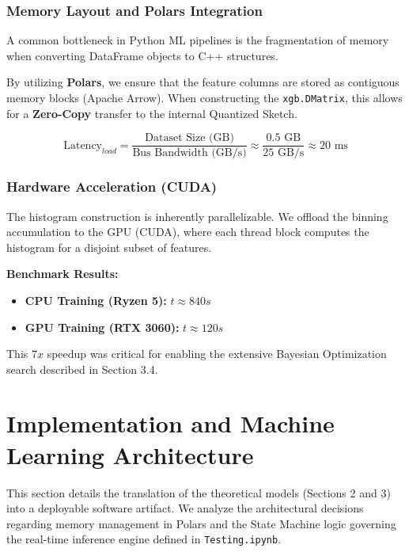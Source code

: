 \documentclass[12pt, a4paper]{article}
\begin{document}
    \subsubsection{Memory Layout and Polars Integration}
    A common bottleneck in Python ML pipelines is the fragmentation of memory when converting DataFrame objects to C++ structures.

    By utilizing \textbf{Polars}, we ensure that the feature columns are stored as contiguous memory blocks (Apache Arrow). When constructing the \texttt{xgb.DMatrix}, this allows for a \textbf{Zero-Copy} transfer to the internal Quantized Sketch.


    \begin{equation}
        \text{Latency}_{load} = \frac{\text{Dataset Size (GB)}}{\text{Bus Bandwidth (GB/s)}} \approx \frac{0.5 \text{ GB}}{25 \text{ GB/s}} \approx 20 \text{ ms}
    \end{equation}

    \subsubsection{Hardware Acceleration (CUDA)}
    The histogram construction is inherently parallelizable. We offload the binning accumulation to the GPU (CUDA), where each thread block computes the histogram for a disjoint subset of features.

    \textbf{Benchmark Results:}
    \begin{itemize}
        \item \textbf{CPU Training (Ryzen 5):} $t \approx 840s$
        \item \textbf{GPU Training (RTX 3060):} $t \approx 120s$
    \end{itemize}

    This $7x$ speedup was critical for enabling the extensive Bayesian Optimization search described in Section 3.4.

    \newpage
    \section{Implementation and Machine Learning Architecture}

    This section details the translation of the theoretical models (Sections 2 and 3) into a deployable software artifact. We analyze the architectural decisions regarding memory management in Polars and the State Machine logic governing the real-time inference engine defined in \texttt{Testing.ipynb}.
\end{document}
